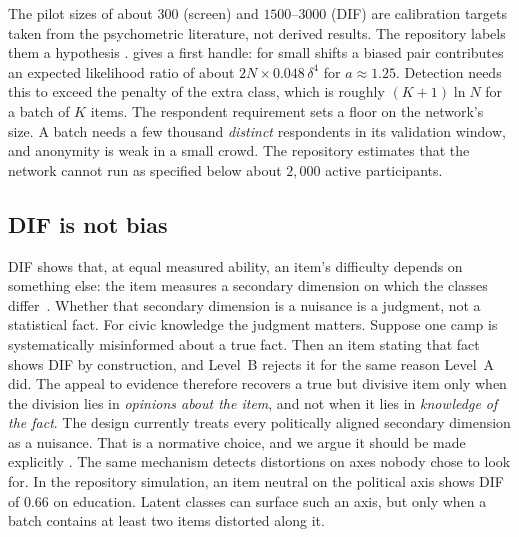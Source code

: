 The pilot sizes of about $300$ (screen) and $1500$--$3000$ (DIF) are calibration targets taken
from the psychometric literature, not derived results. The repository labels them a
hypothesis \openq.  gives a first handle: for small shifts a biased pair
contributes an expected likelihood ratio of about $2N\times0.048\,\delta^4$ for $a\approx1.25$. Detection needs
this to exceed the penalty of the extra class, which is roughly $(K+1)\ln N$ for a batch of $K$
items. The respondent requirement sets a floor on the network's size. A batch needs a few
thousand \emph{distinct} respondents in its validation window, and anonymity is weak in a small
crowd. The repository estimates that the network cannot run as specified below about $2{,}000$
active participants.

\subsection{DIF is not bias}\label{sec:dif-not-bias}

DIF shows that, at equal measured ability, an item's difficulty depends on something else: the
item measures a secondary dimension on which the classes differ~\cite{shealy1993sibtest}.
Whether that secondary dimension is a nuisance is a judgment, not a statistical fact. For civic
knowledge the judgment matters. Suppose one camp is systematically misinformed about a
true fact. Then an item stating that fact shows DIF by construction, and Level~B rejects it for
the same reason Level~A did. The appeal to evidence therefore recovers a true but divisive item
only when the division lies in \emph{opinions about the item}, and not when it lies in
\emph{knowledge of the fact}. The design currently treats every politically aligned secondary
dimension as a nuisance. That is a normative choice, and we argue it should be made explicitly
\designchoice. The same mechanism detects distortions on axes nobody chose to look for. In the
repository simulation, an item neutral on the political axis shows DIF of $0.66$ on education.
Latent classes can surface such an axis, but only when a batch contains at least two items
distorted along it.
